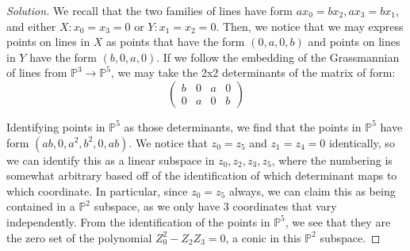 \documentclass[10pt]{article}
\begin{document}
\begin{proof}[Solution]

We recall that the two families of lines have form $ax_0 = bx_2, ax_3 = b x_1$, and either $X: x_0 = x_3 = 0$ or $Y: x_1 = x_2 = 0$. Then, we notice that we may express points on lines in $X$ as points that have the form $(0,a,0,b)$ and points on lines in $Y$ have the form $(b,0,a,0)$. If we follow the embedding of the Grassmannian of lines from $\mathbb{P}^3 \to \mathbb{P}^5$, we may take the 2x2 determinants of the matrix of form: $$  \begin{pmatrix} b & 0 & a & 0 \\ 0 & a & 0 & b \end{pmatrix}$$

Identifying points in $\mathbb{P}^5$ as those determinants, we find that the points in $\mathbb{P}^5$ have form $(ab,0,a^2,b^2,0,ab)$. We notice that $z_0  = z_5$ and $z_1 = z_4 = 0$ identically, so we can identify this as a linear subspace in $z_0, z_2, z_3, z_5$, where the numbering is somewhat arbitrary based off of the identification of which determinant maps to which coordinate. In particular, since $z_0 = z_5$ always, we can claim this as being contained in a $\mathbb{P}^2$ subspace, as we only have 3 coordinates that vary independently. From the identification of the points in $\mathbb{P}^5$, we see that they are the zero set of the polynomial $Z_0^2 - Z_2Z_3 = 0$, a conic in this $\mathbb{P}^2$ subspace. 

\end{proof}
\end{document}
